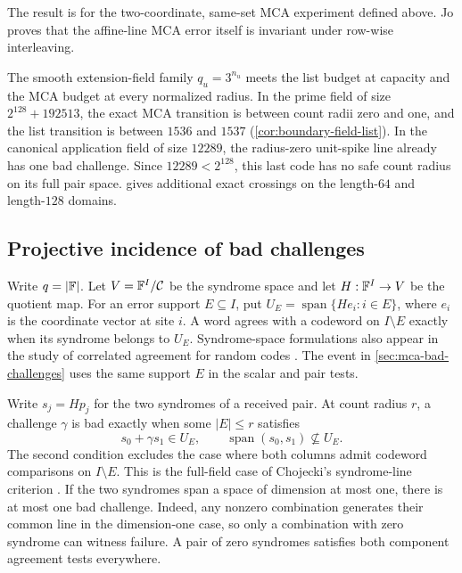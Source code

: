 The result is for the two-coordinate, same-set MCA experiment defined above.
Jo \cite{jo2026interleaving} proves that the affine-line MCA error itself
is invariant under row-wise interleaving.

The smooth extension-field family \(q_u=3^{n_u}\) meets the list
budget at capacity and the MCA budget at every normalized radius. In the
prime field of size \(2^{128}+192513\), the exact MCA transition is between
count radii zero and one, and the list transition is between \(1536\) and
\(1537\) (\cref{cor:boundary-field-list}). In the canonical application field of size
\(12289\), the radius-zero unit-spike line already has one bad challenge.
Since \(12289<2^{128}\), this last code has no safe count radius on its
full pair space.
 gives additional
exact crossings on the length-\(64\) and length-\(128\) domains.

\subsection{Projective incidence of bad challenges}
\label{sec:mca-projective-incidence}

Write \(q=|\mathbb{F}|\). Let \(V=\mathbb{F}^I/\mathcal C\) be the syndrome space and let
\(H:\mathbb{F}^I\to V\) be the quotient map. For an error support \(E\subseteq I\), put
\(U_E=\operatorname{span}\{He_i:i\in E\}\), where \(e_i\) is the coordinate
vector at site \(i\). A word agrees with a codeword on \(I\setminus E\)
exactly when its syndrome belongs to \(U_E\). Syndrome-space formulations
also appear in the study of correlated agreement for random codes
\cite{yuanZhu2026syndromeSpace}. The event in \cref{sec:mca-bad-challenges}
uses the same support \(E\) in the scalar and pair tests.

Write \(s_j=Hp_j\) for the two syndromes of a received pair. At count
radius \(r\), a challenge \(\gamma\) is bad exactly when some
\(|E|\le r\) satisfies
\[
  s_0+\gamma s_1\in U_E,\qquad
  \operatorname{span}(s_0,s_1)\nsubseteq U_E.
\]
The second condition excludes the case where both columns admit codeword
comparisons on \(I\setminus E\). This is the full-field case of Chojecki's
syndrome-line criterion \cite[Section~3]{chojecki2026shortening}.
If the two syndromes span a space of
dimension at most one, there is at most one bad challenge. Indeed, any
nonzero combination generates their common line in the dimension-one
case, so only a combination with zero syndrome can witness failure. A
pair of zero syndromes satisfies both component agreement tests everywhere.

